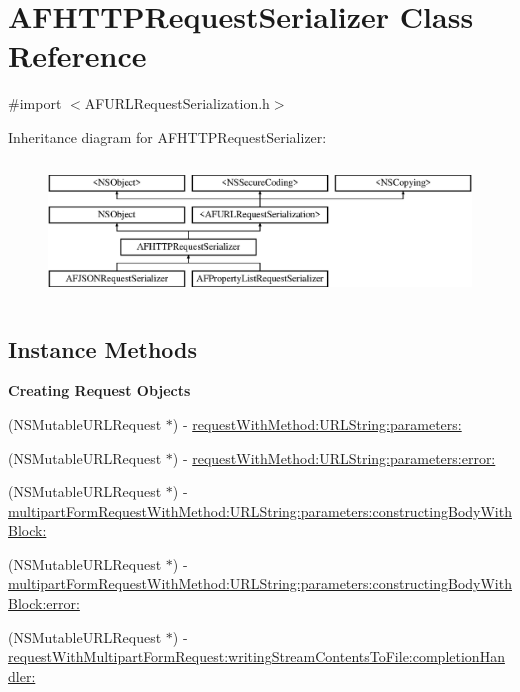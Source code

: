 \hypertarget{interface_a_f_h_t_t_p_request_serializer}{}\section{A\+F\+H\+T\+T\+P\+Request\+Serializer Class Reference}
\label{interface_a_f_h_t_t_p_request_serializer}


{\ttfamily \#import $<$A\+F\+U\+R\+L\+Request\+Serialization.\+h$>$}

Inheritance diagram for A\+F\+H\+T\+T\+P\+Request\+Serializer\+:\begin{figure}[H]
\begin{center}
\leavevmode
\includegraphics[height=3.678161cm]{interface_a_f_h_t_t_p_request_serializer}
\end{center}
\end{figure}
\subsection*{Instance Methods}
\begin{Indent}{\bf Creating Request Objects}\par
{\em 

 

 }\begin{DoxyCompactItemize}
\item 
(N\+S\+Mutable\+U\+R\+L\+Request $\ast$) -\/ \hyperlink{interface_a_f_h_t_t_p_request_serializer_a66e4fd3cd5ed1b9abf48b3f4109efeaa}{request\+With\+Method\+:\+U\+R\+L\+String\+:parameters\+:}
\item 
(N\+S\+Mutable\+U\+R\+L\+Request $\ast$) -\/ \hyperlink{interface_a_f_h_t_t_p_request_serializer_a83fa25b722b0d0b43f7890d2aa9f1a44}{request\+With\+Method\+:\+U\+R\+L\+String\+:parameters\+:error\+:}
\item 
(N\+S\+Mutable\+U\+R\+L\+Request $\ast$) -\/ \hyperlink{interface_a_f_h_t_t_p_request_serializer_a7f44ebde3474a05699c9322f400e91ae}{multipart\+Form\+Request\+With\+Method\+:\+U\+R\+L\+String\+:parameters\+:constructing\+Body\+With\+Block\+:}
\item 
(N\+S\+Mutable\+U\+R\+L\+Request $\ast$) -\/ \hyperlink{interface_a_f_h_t_t_p_request_serializer_a42fc2a7975d21a2f85908465560b250a}{multipart\+Form\+Request\+With\+Method\+:\+U\+R\+L\+String\+:parameters\+:constructing\+Body\+With\+Block\+:error\+:}
\item 
(N\+S\+Mutable\+U\+R\+L\+Request $\ast$) -\/ \hyperlink{interface_a_f_h_t_t_p_request_serializer_ae0e6b764bb36c0e9501730c82e402187}{request\+With\+Multipart\+Form\+Request\+:writing\+Stream\+Contents\+To\+File\+:completion\+Handler\+:}
\end{DoxyCompactItemize}
\end{Indent}
